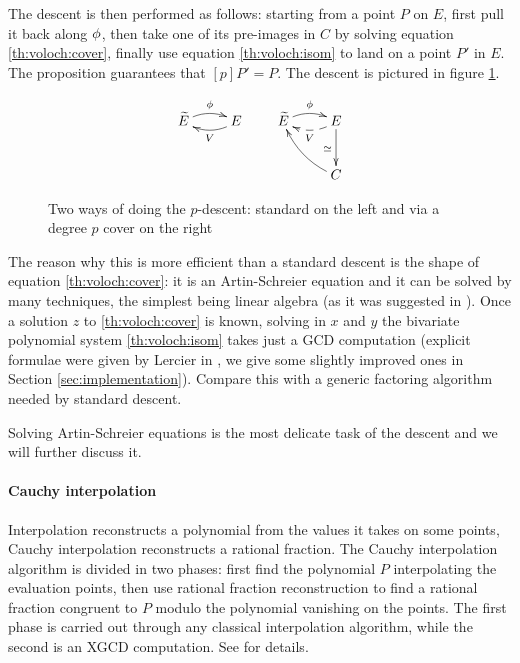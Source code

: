 The descent is then performed as follows: starting from a point $P$ on
$E$, first pull it back along $\phi$, then take one of its
pre-images in $C$ by solving equation \eqref{th:voloch:cover}, finally
use equation \eqref{th:voloch:isom} to land on a point $P'$ in $E$.
The proposition guarantees that $[p]P' = P$. The descent is pictured
in figure \ref{fig:voloch}.

\begin{figure}
  \centering
  \[
  \xymatrix{\widetilde{E}\ar@/^/[r]^{\frobisog} & E\ar@/^/[l]^{V}}
  \qquad
  \xymatrix{
    \widetilde{E}\ar@/^/[r]^{\frobisog} & E\ar@/^/@{-->}[l]^{V}\ar[d]_{\simeq}\\
    & C\ar@/^/[ul]
  }
  \]
  
  \caption{Two ways of doing the $p$-descent: standard on the left and via a degree $p$ cover on the right}
  \label{fig:voloch}
\end{figure}


The reason why this is more efficient than a standard descent is the
shape of equation \eqref{th:voloch:cover}: it is an Artin-Schreier
equation and it can be solved by many techniques, the simplest being
linear algebra (as it was suggested in \cite{Cou96}). Once a solution
$z$ to \eqref{th:voloch:cover} is known, solving in $x$ and $y$ the
bivariate polynomial system \eqref{th:voloch:isom} takes just a GCD
computation (explicit formulae were given by Lercier in
\cite[$\S$6.2]{Ler97}, we give some slightly improved ones in Section
\ref{sec:implementation}). Compare this with a generic factoring
algorithm needed by standard descent.

Solving Artin-Schreier equations is the most delicate task of the
descent and we will further discuss it.


\paragraph{Cauchy interpolation}
Interpolation reconstructs a polynomial from the values it takes on
some points, Cauchy interpolation reconstructs a rational
fraction. The Cauchy interpolation algorithm is divided in two phases:
first find the polynomial $P$ interpolating the evaluation points,
then use rational fraction reconstruction to find a rational fraction
congruent to $P$ modulo the polynomial vanishing on the points. The
first phase is carried out through any classical interpolation
algorithm, while the second is an XGCD computation. See
\cite[$\S$5.8]{vzGG} for details.

